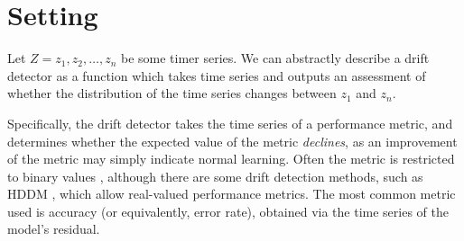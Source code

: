 


\section{Setting} \label{mdd:setting}

Let $Z=z_1,z_2,\dots,z_n$ be some timer series. We can abstractly describe a drift detector as a function which takes time series and outputs an assessment of whether the distribution of the time series changes between $z_1$ and $z_n$. 

Specifically, the drift detector takes the time series of a performance metric, and determines whether the expected value of the metric {\it declines}, as an improvement of the metric may simply indicate normal learning. Often the metric is restricted to binary values \cite{STEPD}\cite{ADWIN}\cite{EDDM}, although there are some drift detection methods, such as HDDM \cite{HDDM}, which allow real-valued performance metrics. The most common metric used is accuracy (or equivalently, error rate), obtained via the time series of the model's residual.

